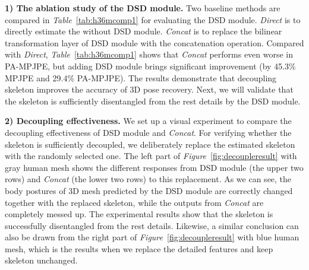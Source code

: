 \documentclass[10pt,twocolumn,letterpaper]{article}
\begin{document}
\begin{table*}
  \begin{center}
  \end{center}
  \caption{MPJAE(): Acceleration error over the poses of the predicted 3D human meshes.}
   \label{tab:MPJAE}
\end{table*}

\textbf{1) The ablation study of the DSD module.} Two baseline methods are compared in \textit{Table}~\ref{tab:h36mcomp1} for evaluating the DSD module. \textit{Direct} is to directly estimate the  without DSD module. \textit{Concat} is to replace the bilinear transformation layer of DSD module with the concatenation operation. Compared with \textit{Direct}, \textit{Table}~\ref{tab:h36mcomp1} shows that \textit{Concat} performs even worse in PA-MPJPE, but adding DSD module brings significant improvement (by 45.3\% MPJPE and 29.4\% PA-MPJPE). The results demonstrate that decoupling skeleton improves the accuracy of 3D pose recovery. Next, we will validate that the skeleton is sufficiently disentangled from the rest details by the DSD module.

\textbf{2) Decoupling effectiveness.} We set up a visual experiment to compare the decoupling effectiveness of DSD module and \textit{Concat}. For verifying whether the skeleton is sufficiently decoupled, we deliberately replace the estimated skeleton with the randomly selected one. The left part of \textit{Figure}~\ref{fig:decoupleresult} with gray human mesh shows the different responses from DSD module (the upper two rows) and \textit{Concat} (the lower two rows) to this replacement. As we can see, the body postures of 3D mesh predicted by the DSD module are correctly changed together with the replaced skeleton, while the outputs from \textit{Concat} are completely messed up. The experimental results show that the skeleton is successfully disentangled from the rest details. Likewise, a similar conclusion can also be drawn from the right part of \textit{Figure}~\ref{fig:decoupleresult} with blue human mesh, which is the results when we replace the detailed features and keep skeleton unchanged.
\end{document}
